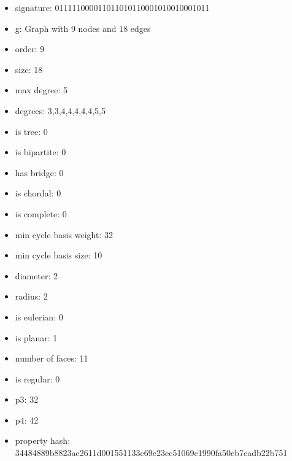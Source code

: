 \newpage
\begin{figure}
\end{figure}
\begin{itemize}
\item signature: 011111000011011010110001010010001011
\item g: Graph with 9 nodes and 18 edges
\item order: 9
\item size: 18
\item max degree: 5
\item degrees: 3,3,4,4,4,4,4,5,5
\item is tree: 0
\item is bipartite: 0
\item has bridge: 0
\item is chordal: 0
\item is complete: 0
\item min cycle basis weight: 32
\item min cycle basis size: 10
\item diameter: 2
\item radius: 2
\item is eulerian: 0
\item is planar: 1
\item number of faces: 11
\item is regular: 0
\item p3: 32
\item p4: 42
\item property hash: 34484889b8823ae2611d001551133c69e23ec51069c1990fa50cb7cadb22b751
\end{itemize}
